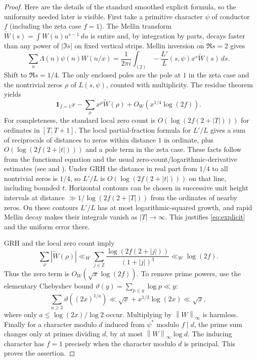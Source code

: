 \documentclass[11pt]{article}
\theoremstyle{remark}\newtheorem{remark}[theorem]{Remark}
\newcommand{\norm}[1]{\left\lVert#1\right\rVert}
\newcommand{\abs}[1]{\left|#1\right|}
\newcommand{\one}{\mathbf 1}
\begin{document}
\begin{proof}
Here are the details of the standard smoothed explicit formula, so the uniformity needed later is visible. First take a primitive character $\psi$ of conductor $f$ (including the zeta case $f=1$). The Mellin transform $\widetilde W(s)=\int W(u)u^{s-1}\,du$ is entire and, by integration by parts, decays faster than any power of $\abs{\Im s}$ on fixed vertical strips. Mellin inversion on $\Re s=2$ gives
\[
 \sum_n\Lambda(n)\psi(n)W(n/x)=\frac1{2\pi i}\int_{(2)}
 -\frac{L'}{L}(s,\psi)x^s\widetilde W(s)\,ds.
\]
Shift to $\Re s=1/4$. The only enclosed poles are the pole at $1$ in the zeta case and the nontrivial zeros $\rho$ of $L(s,\psi)$, counted with multiplicity. The residue theorem yields
\begin{equation}\label{eq:explicit}
 \one_{f=1}x-\sum_\rho x^\rho\widetilde W(\rho)+O_W(x^{1/4}\log(2f)).
\end{equation}
For completeness, the standard local zero count is $O(\log(2f(2+\abs T)))$ for ordinates in $[T,T+1]$. The local partial-fraction formula for $L'/L$ gives a sum of reciprocals of distances to zeros within distance $1$ in ordinate, plus $O(\log(2f(2+\abs t)))$ and a pole term in the zeta case. These facts follow from the functional equation and the usual zero-count/logarithmic-derivative estimates (see \cite[Chapter 13]{mv} and \cite[Exercise 45]{tao}). Under GRH the distance in real part from $1/4$ to all nontrivial zeros is $1/4$, so $L'/L$ is $O(\log(2f(2+\abs t)))$ on that line, including bounded $t$. Horizontal contours can be chosen in successive unit height intervals at distance $\gg 1/\log(2f(2+\abs T))$ from the ordinates of nearby zeros. On these contours $L'/L$ has at most logarithmic-squared growth, and rapid Mellin decay makes their integrals vanish as $\abs T\to\infty$. This justifies \eqref{eq:explicit} and the uniform error there.

GRH and the local zero count imply
\[
 \sum_\rho\abs{\widetilde W(\rho)}
 \ll_W\sum_{j\in\mathbb Z}\frac{\log(2f(2+\abs j))}{(1+\abs j)^3}
 \ll_W\log(2f).
\]
Thus the zero term is $O_W(\sqrt x\log(2f))$. To remove prime powers, use the elementary Chebyshev bound $\vartheta(y)=\sum_{p\le y}\log p\ll y$:
\[
 \sum_{a\ge2}\vartheta((2x)^{1/a})
 \ll \sqrt x+x^{1/3}\log(2x)\ll\sqrt x,
\]
where only $a\le\log(2x)/\log2$ occur. Multiplying by $\norm W_\infty$ is harmless. Finally for a character modulo $d$ induced from $\psi^*$ modulo $f\mid d$, the prime sum changes only at primes dividing $d$, by at most $\norm W_\infty\log d$. The inducing character has $f=1$ precisely when the character modulo $d$ is principal. This proves the assertion.
\end{proof}
\end{document}
